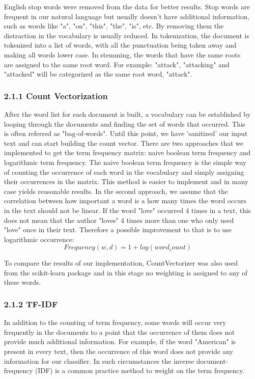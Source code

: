 \documentclass{neu_handout}
\begin{document}
English stop words were removed from the data for better results. Stop words are frequent in our natural language but usually doesn't have additional information, such as words like "a", "on", "this", "the", "is", etc. By removing them the distraction in the vocabulary is usually reduced. In tokenization, the document is tokenized into a list of words, with all the punctuation being taken away and making all words lower case. In stemming, the words that have the same roots are assigned to the same root word. For example: "attack", "attacking" and "attacked" will be categorized as the same root word, "attack".

\subsubsection*{2.1.1 Count Vectorization}

After the word list for each document is built, a vocabulary can be established by looping through the documents and finding the set of words that occurred. This is often referred as "bag-of-words". Until this point, we have 'sanitized' our input text and can start building the count vector. There are two approaches that we implemented to get the term frequency matrix: naive boolean term frequency and logarithmic term frequency. The naive boolean term frequency is the simple way of counting the occurrence of each word in the vocabulary and simply assigning their occurrences in the matrix. This method is easier to implement and in many case yields reasonable results. In the second approach, we assume that the correlation between how important a word is a how many times the word occurs in the text should not be linear. If the word "love" occurred 4 times in a text, this does not mean that the author "loves" 4 times more than one who only used "love" once in their text. Therefore a possible improvement to that is to use logarithmic occurrence:
$$Frequency(w,d) = 1 + log(word_count)$$
 
To compare the results of our implementation, CountVectorizer was also used from the scikit-learn package and in this stage no weighting is assigned to any of these words.


\subsubsection*{2.1.2 TF-IDF}
In addition to the counting of term frequency, some words will occur very frequently in the documents to a point that the occurrence of them does not provide much additional information. For example, if the word "American" is present in every text, then the occurrence of this word does not provide any information for our classifier. In such circumstances the inverse document-frequency (IDF) is a common practice method to weight on the term frequency.
\end{document}
